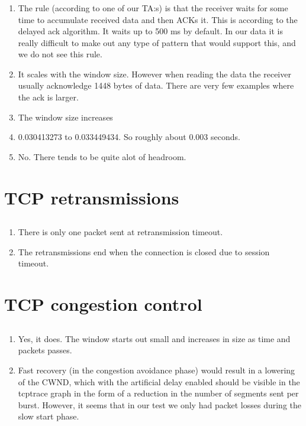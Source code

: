 \documentclass[a4paper]{article}
\begin{document}
\subsubsection{}
\begin{enumerate}[label=\alph*)]
\item The rule (according to one of our TA:s) is that the receiver waits for some time to
accumulate received data and then ACKs it. This is according to the delayed ack algorithm. It waits up to 500 ms by default. In our data it is really difficult to make out any type of pattern that would support this, and we do not see this rule.

\item It scales with the window size. However when reading the data the receiver usually acknowledge 1448 bytes of data. There are very few examples where the ack is larger.
\item The window size increases 
\item 0.030413273 to 0.033449434. So roughly about 0.003 seconds.
\item No. There tends to be quite alot of headroom.
\end{enumerate}
\section{TCP retransmissions}
\setcounter{subsection}{5}
\subsection{}
\begin{enumerate}[label=\alph*)]
\item There is only one packet sent at retransmission timeout.

\item The retransmissions end when the connection is closed due to session timeout.
\end{enumerate}
\section{TCP congestion control}
\setcounter{subsection}{5}
\subsection{}
\begin{enumerate}[label=\alph*)]
\item Yes, it does. The window starts out small and increases in size as time and packets passes. 
\item Fast recovery (in the congestion avoidance phase) would result in a lowering of the CWND, which with the artificial delay enabled should be visible in the tcptrace graph in the form of a reduction in the number of segments sent per burst. However, it seems that in our test we only had packet losses during the slow start phase.
\end{enumerate}
\end{document}
